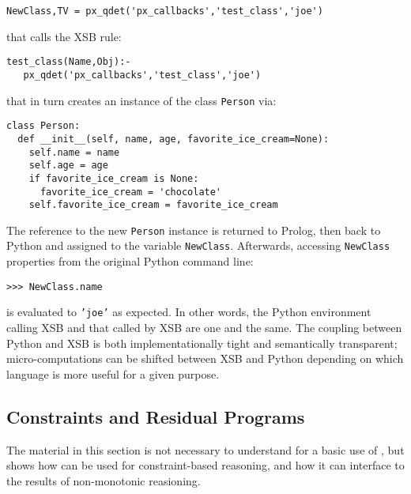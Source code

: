 \begin{verbatim}
NewClass,TV = px_qdet('px_callbacks','test_class','joe')
\end{verbatim}
\noindent
that calls the XSB rule:
\begin{verbatim}
test_class(Name,Obj):-
   px_qdet('px_callbacks','test_class','joe')
\end{verbatim}
that in turn creates an instance of the class {\tt Person} via:
\begin{verbatim}
class Person:
  def __init__(self, name, age, favorite_ice_cream=None):
    self.name = name
    self.age = age
    if favorite_ice_cream is None:
      favorite_ice_cream = 'chocolate'
    self.favorite_ice_cream = favorite_ice_cream
\end{verbatim}
The reference to the new {\tt Person} instance is returned to Prolog,
then back to Python and assigned to the variable {\tt NewClass}.
Afterwards, accessing {\tt NewClass} properties from the original
Python command line:
\begin{verbatim}
>>> NewClass.name
\end{verbatim}
is evaluated to {\tt 'joe'} as expected.  In other words, the Python
environment calling XSB and that called by XSB are one and the same.
The coupling between Python and XSB is both implementationally tight
and semantically transparent; micro-computations can be shifted between
XSB and Python depending on which language is more useful for a given
purpose.

\subsection{Constraints and Residual Programs} 

The material in this section is not necessary to understand for a
basic use of \px{}, but shows how \px{} can be used for
constraint-based reasoning, and how it can interface to the results of
non-monotonic reasioning.

